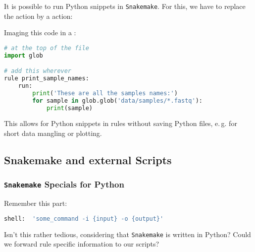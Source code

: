 \begin{frame}[fragile]
  \frametitle{}
  \vspace{-0.5em}
  It is possible to run Python snippets in \texttt{Snakemake}. For this, we have to replace the  action by a  action:\vspace{-0.5em}
  \begin{task}
  	Imaging this code in a :
  \end{task}\vspace{-0.5em}
  \begin{lstlisting}[language=Python,style=Python, basicstyle=\footnotesize]
# at the top of the file
import glob

# add this wherever
rule print_sample_names:
    run:
        print('These are all the samples names:')
        for sample in glob.glob('data/samples/*.fastq'):
            print(sample)

  \end{lstlisting}\vspace{-0.5em}
  \pause\footnotesize
  \begin{hint}
     This allows for Python snippets in rules without saving Python files, e.\,g. for short data mangling or plotting.
  \end{hint}
\end{frame}

\subsection{Snakemake and external Scripts}

\begin{frame}[fragile]
  \frametitle{\texttt{Snakemake} Specials for Python}
  Remember this part:
  \begin{lstlisting}[language=Python,style=Python]
shell:  'some_command -i {input} -o {output}'
  \end{lstlisting}
  \begin{question}
  	Isn't this rather tedious, considering that \texttt{Snakemake} is written in Python? Could we forward rule specific information to our scripts?
  \end{question}
\end{frame}

